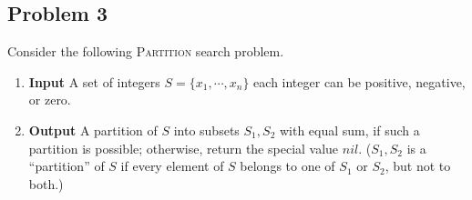 \documentclass[11pt]{article}
\begin{document}
\begin{enumerate}
\end{enumerate}


\subsection*{Problem 3}

Consider the following \textsc{Partition} search problem.
\begin{enumerate}
    \item \textbf{Input} A set of integers $S = \{ x_1, \cdots, x_n \}$ each integer can be positive, negative, or zero. 
    \item \textbf{Output} A partition of $S$ into subsets $S_1, S_2$ with equal sum, if such a partition is possible; otherwise, return the special value $nil$. ($S_1,S_2$ is a “partition” of $S$ if every element of $S$ belongs to one of $S_1$ or $S_2$, but not to both.)
\end{enumerate}
\end{document}
